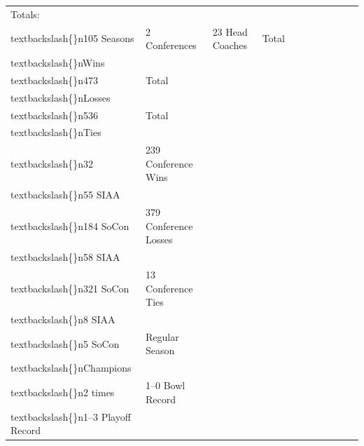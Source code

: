 \documentclass{article}
\begin{document}
\begin{tabular}{lllllllllll}
Totals:\\textbackslash\{\}n105 Seasons & 2 Conferences & 23 Head Coaches & Total\\textbackslash\{\}nWins\\textbackslash\{\}n473 & Total\\textbackslash\{\}nLosses\\textbackslash\{\}n536 & Total\\textbackslash\{\}nTies\\textbackslash\{\}n32 & 239 Conference Wins\\textbackslash\{\}n55 SIAA\\textbackslash\{\}n184 SoCon & 379 Conference Losses\\textbackslash\{\}n58 SIAA\\textbackslash\{\}n321 SoCon & 13 Conference Ties\\textbackslash\{\}n8 SIAA\\textbackslash\{\}n5 SoCon & Regular Season\\textbackslash\{\}nChampions\\textbackslash\{\}n2 times & 1–0 Bowl Record\\textbackslash\{\}n1–3 Playoff Record \\
\bottomrule
\end{tabular}
\end{document}
